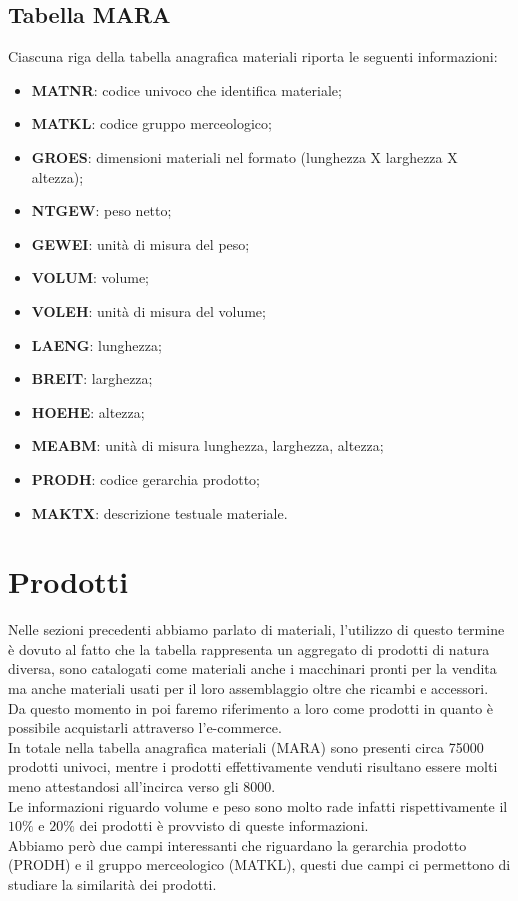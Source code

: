 \subsection{Tabella MARA}
Ciascuna riga della tabella anagrafica materiali riporta le seguenti informazioni:
\begin{itemize}
	\item \textbf{MATNR}: codice univoco che identifica materiale;
	\item \textbf{MATKL}: codice gruppo merceologico;
	\item \textbf{GROES}: dimensioni materiali nel formato (lunghezza X larghezza X altezza);
	\item \textbf{NTGEW}: peso netto;
	\item \textbf{GEWEI}: unità di misura del peso;
	\item \textbf{VOLUM}: volume;
	\item \textbf{VOLEH}: unità di misura del volume;
	\item \textbf{LAENG}: lunghezza;
	\item \textbf{BREIT}: larghezza;
	\item \textbf{HOEHE}: altezza;
	\item \textbf{MEABM}: unità di misura lunghezza, larghezza, altezza;
	\item \textbf{PRODH}: codice gerarchia prodotto; 
	\item \textbf{MAKTX}: descrizione testuale materiale.
\end{itemize}


\section{Prodotti}
Nelle sezioni precedenti abbiamo parlato di materiali, l'utilizzo di questo termine è dovuto al fatto che la tabella rappresenta un aggregato di prodotti di natura diversa, sono catalogati come materiali anche i macchinari pronti per la vendita ma anche materiali usati per il loro assemblaggio oltre che ricambi e accessori.\\
Da questo momento in poi faremo riferimento a loro come prodotti in quanto è possibile acquistarli attraverso l'e-commerce.\\
In totale nella tabella anagrafica materiali (MARA) sono presenti circa 75000 prodotti univoci, mentre i prodotti effettivamente venduti risultano essere molti meno attestandosi all'incirca verso gli 8000.\\
Le informazioni riguardo volume e peso sono molto rade infatti rispettivamente il $10\%$ e $20\%$ dei prodotti è provvisto di queste informazioni. \\
Abbiamo però due campi interessanti che riguardano la gerarchia prodotto (PRODH) e il gruppo merceologico (MATKL), questi due campi ci permettono di studiare la similarità dei prodotti.

